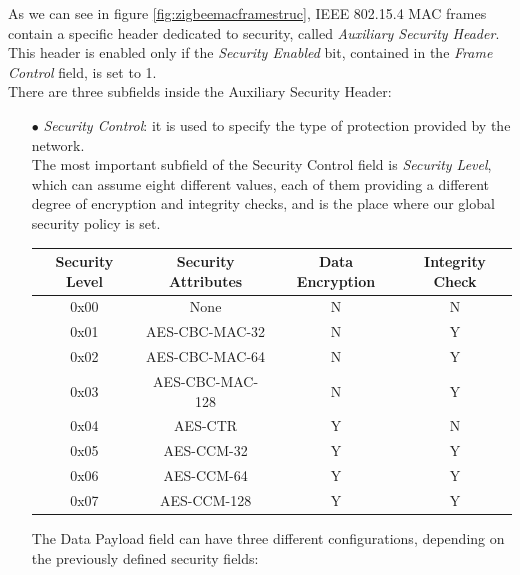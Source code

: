 \documentclass[12pt]{report}
\begin{document}
{As we can see in figure \ref{fig:zigbeemacframestruc}, IEEE 802.15.4 MAC frames contain a specific header dedicated to security, called \emph{Auxiliary Security Header}.\\
This header is enabled only if the \emph{Security Enabled} bit, contained in the \emph{Frame Control} field, is set to 1.\\
There are three subfields inside the Auxiliary Security Header:

\begin{itemize}
\setlength{\itemindent}{+4mm}
\item[$\bullet$] \emph{Security Control}: it is used to specify the type of protection provided by the network.\\
The most important subfield of the Security Control field is \emph{Security Level}, which can assume eight different values, each of them providing a different degree of encryption and integrity checks, and is the place where our global security policy is set.

\begin{center}
\small
   \begin{tabular}{ | c | c | c | c |}
    \hline
    Security Level & Security Attributes & Data Encryption & Integrity Check \\ \hline
    0x00 & None & N & N \\ \hline
    0x01 & AES-CBC-MAC-32 & N & Y\\ \hline
    0x02 & AES-CBC-MAC-64 & N & Y \\ \hline
    0x03 & AES-CBC-MAC-128 & N & Y\\ \hline
    0x04 & AES-CTR & Y & N\\ \hline
    0x05 & AES-CCM-32 & Y & Y\\ \hline
    0x06 & AES-CCM-64 & Y & Y\\ \hline
    0x07 & AES-CCM-128 & Y &Y\\ \hline
    \end{tabular}
\end{center}
\bigskip
The Data Payload field can have three different configurations, depending on the previously defined security fields:


\end{itemize}}
\end{document}
